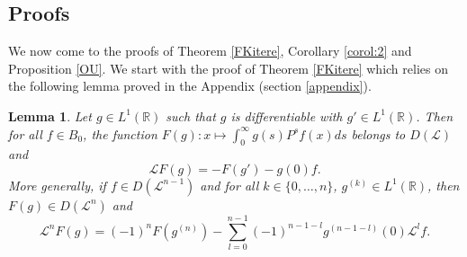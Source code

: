 \documentclass[a4paper, 11pt]{article}
\newtheorem{lem}{Lemma}
\newcommand{\R}{\mathbb{R}}
\newcommand{\1}{\mathbf{1}}
\begin{document}
\subsection{Proofs}\label{proofs}
\noindent We now come to the proofs of Theorem \ref{FKitere}, Corollary \ref{corol:2} and Proposition \ref{OU}. We start with the proof of Theorem \ref{FKitere} which relies on the following lemma proved in the Appendix (section \ref{appendix}).


\begin{lem}
\label{IPP}
Let $g\in L^1(\R)$ such that $g$ is differentiable with $g'\in L^1(\R)$. Then for all $f\in B_0$, the function 
$F(g):x\mapsto \int_0^\infty g(s)P^sf(x)ds$ belongs to $D(\mathcal{L})$ and
$$\mathcal{L}F(g)=-F(g')-g(0)f.$$
More generally, if $f\in D(\mathcal{L}^{n-1})$ and for all $k\in\{0,\ldots, n\}$, $g^{(k)}\in L^1(\R)$,  then $F(g)\in D(\mathcal{L}^n)$ and
\begin{equation}
\mathcal{L}^nF(g)=(-1)^nF(g^{(n)})-\sum_{l=0}^{n-1}(-1)^{n-1-l}g^{(n-1-l)}(0)\mathcal{L}^lf. \label{formuleIPP}
\end{equation}
\end{lem}

\medskip
\end{document}
